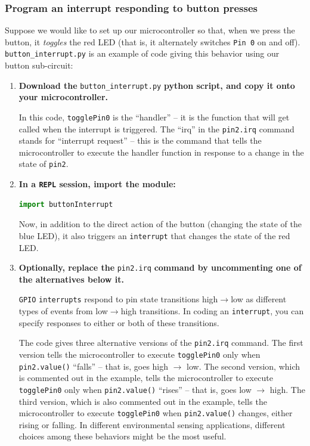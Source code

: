 \subsubsection{\howto Program an interrupt responding to button presses}
Suppose we would like to set up our microcontroller so that, when we press the button, it \emph{toggles} the red LED (that is, it alternately switches \texttt{Pin 0} on and off). \verb|button_interrupt.py| is an example of code giving this behavior using our button sub-circuit:
\begin{enumerate}
	\item \textbf{Download the} \lstinline{button_interrupt.py} \textbf{python script, and copy it onto your microcontroller.}
	
	In this code, \lstinline{togglePin0} is the ``handler'' -- it is the function that will get called when the interrupt is triggered. 
	The ``irq'' in the \lstinline{pin2.irq} command stands for ``interrupt request'' -- this is the command that tells the microcontroller to execute the handler function in response to a change in the state of \lstinline{pin2}. 
	
	\item \textbf{In a \texttt{REPL} session, import the module:}
\begin{lstlisting}[language=Python]
import buttonInterrupt
\end{lstlisting}	
	Now, in addition to the direct action of the button (changing the state of the blue LED), it also triggers an \texttt{interrupt} that changes the state of the red LED.
	\item \textbf{Optionally, replace the} \lstinline{pin2.irq} \textbf{command by uncommenting one of the alternatives below it.}
		
	\texttt{GPIO} \texttt{interrupts} respond to pin state transitions high$\rightarrow$low as different types of events from low$\rightarrow$high transitions.
	In coding an \texttt{interrupt}, you can specify responses to either or both of these transitions.
	
	\smallskip
	The code gives three alternative versions of the \lstinline{pin2.irq} command.
	The first version tells the microcontroller to execute \lstinline{togglePin0} only when \lstinline{pin2.value()} ``falls'' -- that is, goes high $\rightarrow$ low. 
	The second version, which is commented out in the example, tells the microcontroller to execute \lstinline{togglePin0} only when \lstinline{pin2.value()} ``rises'' -- that is, goes low $\rightarrow$ high. 
	The third version, which is also commented out in the example, tells the microcontroller to execute \lstinline{togglePin0} when \lstinline{pin2.value()} changes, either rising or falling.
	In different environmental sensing applications, different choices among these behaviors might be the most useful. 


\end{enumerate}
